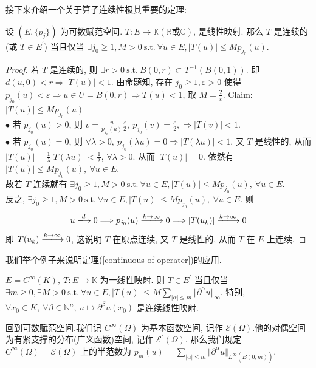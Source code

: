 \documentclass[11pt]{ctexart}[UTF8]
\begin{document}
接下来介绍一个关于算子连续性极其重要的定理:
\begin{theorem}\label{continuous of operater}
    设 $(E,\{ p_{j} \})$ 为可数赋范空间. $T: E \longrightarrow \mathbb{K}(\mathbb{R}\text{或}\mathbb{C})$, 是线性映射. 那么 $T$ 是连续的(或 $T \in E^{\prime}$)
    当且仅当 $\exists j_{0} \geq 1, M > 0\ \mathrm{s.t.}\ \forall u \in E, |T(u)| \leq M p_{j_{0}}(u)$.
\end{theorem}
\begin{proof}
    若 $T$ 是连续的, 则 $\exists r > 0\ \mathrm{s.t.}\ B(0,r) \subset T^{-1}(B(0,1))$. 即 $d(u,0) < r \Longrightarrow |T(u)| < 1$. 
    由命题知, 存在 $j_{0} \geq 1,\varepsilon >0$ 使得 $p_{j_{0}}(u) < \varepsilon \Longrightarrow u \in U=B(0,r) \Longrightarrow T(u) <1$, 取
    $M = \frac{2}{\varepsilon}$. Claim: $\left| T(u) \right| \leq Mp_{j_{0}}(u)$\\
    $\bullet$ 若 $p_{j_{0}}(u) > 0$, 则 $v = \frac{u}{p_{j_{0}}(u)}\frac{\varepsilon}{2},\ p_{j_{0}}(v) = \frac{\varepsilon}{2},\Longrightarrow \left| T(v) \right|<1.$\\
    $\bullet$ 若 $p_{j_{0}}(u) = 0$, 则 $\forall \lambda>0,\ p_{j_{0}}(\lambda u) = 0  \Longrightarrow |T(\lambda u)| < 1$. 又 $T$ 是线性的, 从而 $|T(u)| = \frac{1}{\lambda} |T(\lambda u)| < \frac{1}{\lambda}$, $\forall \lambda > 0$. 从而 $|T(u)| = 0$.
    依然有 $|T(u)| \leq M p_{j_{0}}(u),\ \forall u \in E$.\\
    故若 $T$ 连续就有 $\exists j_{0} \geq 1, M > 0\ \mathrm{s.t.}\ \forall u \in E, |T(u)| \leq M p_{j_{0}}(u), \ \forall u \in E$.\\
    反之, $\exists j_{0} \geq 1, M > 0\ \mathrm{s.t.}\ \forall u \in E, |T(u)| \leq M p_{j_{0}}(u), \ \forall u \in E$. 则
    \begin{equation*}
        u \xlongrightarrow{d} 0 \Longrightarrow p_{j_{0}}(u) \xlongrightarrow{k \to \infty} 0 \Longrightarrow |T(u_{k})| \xlongrightarrow{k \to \infty} 0
    \end{equation*}
    即 $T(u_{k}) \xlongrightarrow{k \to \infty} 0$, 这说明 $T$ 在原点连续, 又 $T$ 是线性的, 从而 $T$ 在 $E$ 上连续.
\end{proof}
我们举个例子来说明定理(\ref{continuous of operater})的应用.
\begin{example}
    $E = C^{\infty}(K),\ T: E \to \mathbb{K}$ 为一线性映射. 则 $T \in E^{\prime}$ 当且仅当 $\exists m \geq 0, \exists M > 0\ \mathrm{s.t.}\ \forall u \in E, |T(u)| \leq M \sum\limits_{|\alpha|\leq m} \Vert \partial^{\alpha} u \Vert_{\infty}$.
    特别, $\forall x_{0} \in K ,\ \forall \beta \in \mathbb{N}^{n},\ u \longmapsto \partial^{\beta} u(x_{0})$ 是连续线性映射.
\end{example}
回到可数赋范空间.我们记 $C^{\infty}(\Omega)$ 为基本函数空间, 记作 $\mathscr{E}(\Omega)$.他的对偶空间为有紧支撑的分布(广义函数)空间, 记作 $\mathscr{E}^{\prime}(\Omega)$.
那么我们规定 $C^{\infty}(\Omega) = \mathscr{E}(\Omega)$ 上的半范数为 $p_{m}(u) = \sum\limits_{|\alpha|\leq m} \Vert \partial^{\alpha} u \Vert_{L^{\infty}(\overline{B(0,m)})}$.
\end{document}

